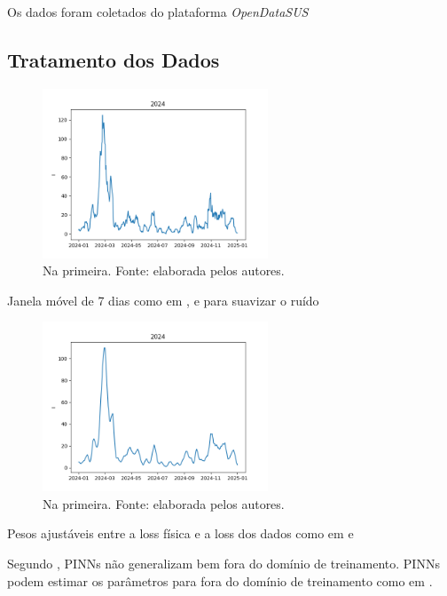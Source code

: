 Os dados foram coletados do plataforma \textit{OpenDataSUS} \cite{opendatasus}

\subsection{Tratamento dos Dados}

\begin{figure}[htpb]
\centering
\includegraphics[width=0.6\textwidth]{figuras/data-2024-ES.png}
\caption{Na primeira. Fonte: elaborada pelos autores.}
\label{fig:dados-reais-sus-crus}
\end{figure}

Janela móvel de 7 dias como em \cite{han-etal:24-prim-artigo-alemanha},
\cite{long-etal:21-L2} e \cite{shamsara-etal:25-omicron} para suavizar o ruído


\begin{figure}[htpb]
\centering
\includegraphics[width=0.6\textwidth]{figuras/smoothed-data-2024-ES.png}
\caption{Na primeira. Fonte: elaborada pelos autores.}
\label{fig:dados-reais-sus-media-movel}
\end{figure}

Pesos ajustáveis entre a loss física e a loss dos dados como em 
\cite{long-etal:21-L2} e 
\cite{shamsara-etal:25-omicron}

Segundo \cite{bonfanti-etal:24-generalizacao-pinns}, PINNs não generalizam bem
fora do domínio de treinamento. PINNs podem estimar os parâmetros para fora
do domínio de treinamento como em \cite{millevoi-etal:24-split-join-pinns}.

